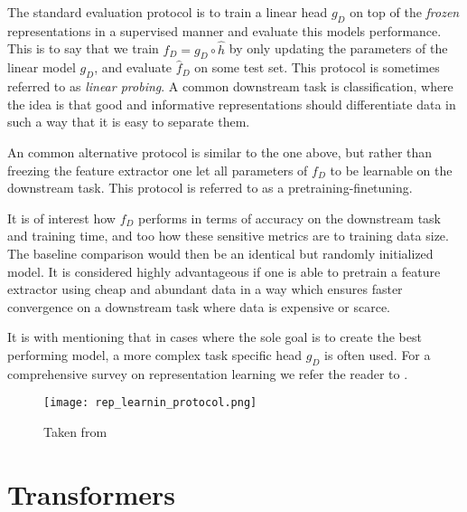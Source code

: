 \documentclass[../../thesis.tex]{subfiles}
\begin{document}
The standard evaluation protocol is to train a linear head $g_D$ on top of the \textit{frozen} representations in a supervised manner and evaluate this models performance. This is to say that we train  $f_D = g_D\circ \widehat{h}$ by only updating the parameters of the linear model $g_D$, and evaluate $\widehat{f}_D$ on some test set. This protocol is sometimes referred to as \textit{linear probing}. A common downstream task is classification, where the idea is that good and informative representations should differentiate data in such a way that it is easy to separate them. \newline

An common alternative protocol is similar to the one above, but rather than freezing the feature extractor one let all parameters of $f_D$ to be learnable on the downstream task. This protocol is referred to as a pretraining-finetuning. \newline

It is of interest how $f_D$ performs in terms of accuracy on the downstream task and training time, and too how these sensitive metrics are to training data size. The baseline comparison would then be an identical but randomly initialized model. It is considered highly advantageous if one is able to pretrain a feature extractor using cheap and abundant data in a way which ensures faster convergence on a downstream task where data is expensive or scarce.\newline

It is with mentioning that in cases where the sole goal is to create the best performing model, a more complex task specific head $g_D$ is often used. For a comprehensive survey on representation learning we refer the reader to \cite{nozawa2022empirical}.


\begin{figure}[h]
    \texttt{[image: rep\_learnin\_protocol.png]}
    \centering    
    \caption{Taken from \cite{nozawa2022empirical}}
\end{figure}


\section{Transformers}
\end{document}
